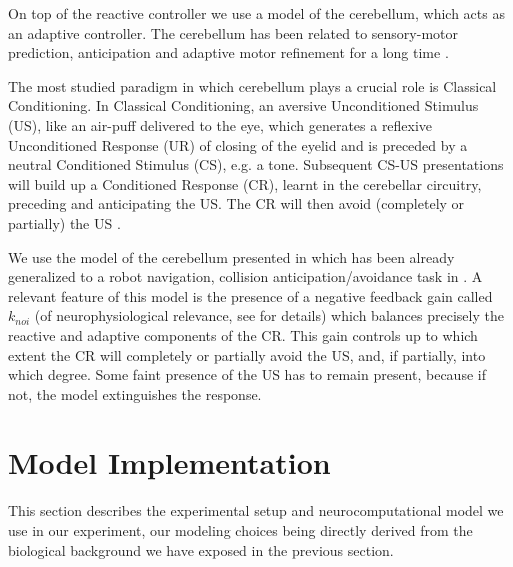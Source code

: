 \documentclass[letterpaper, 10 pt, conference]{ieeeconf}  %
\begin{document}
On top of the reactive controller we use a model of the cerebellum, which acts as an adaptive controller. The cerebellum has been related to sensory-motor prediction, anticipation and adaptive motor refinement for a long time \cite{houk2003}.

The most studied paradigm in which cerebellum plays a crucial role is Classical Conditioning. In Classical Conditioning, an aversive Unconditioned Stimulus (US), like an air-puff delivered to the eye, which generates a reflexive Unconditioned Response (UR) of closing of the eyelid and is preceded by a neutral Conditioned Stimulus (CS), e.g. a tone. Subsequent CS-US presentations will build up a Conditioned Response (CR), learnt in the cerebellar circuitry, preceding and anticipating the US. The CR will then avoid (completely or partially) the US \cite{gormezano1987classical}.

We use the model of the cerebellum presented in \cite{herreros2013nucleo} which has been already generalized to a robot navigation, collision anticipation/avoidance task in \cite{herreros2013speed}. A relevant feature of this model is the presence of a negative feedback gain called $k_{noi}$ (of neurophysiological relevance, see \cite{herreros2013nucleo} for details) which balances precisely the reactive and adaptive components of the CR. This gain controls up to which extent the CR will completely or partially avoid the US, and, if partially, into which degree. Some faint presence of the US has to remain present, because if not, the model extinguishes the response.


\section{Model Implementation}
\label{sec:model}

This section describes the experimental setup and neurocomputational model we use in our experiment, our modeling choices being directly derived from the biological background we have exposed in the previous section. 
\end{document}
